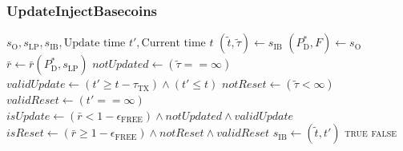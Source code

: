 \documentclass{ifcolog}
\newcommand{\Pdt}{P_{\mathrm{D}}^{*}}
\newcommand{\rr}{\bar{r}}
\newcommand{\slp}{s_{\mathrm{LP}}}
\newcommand{\soracle}{s_{\textrm{O}}}
\newcommand{\sarb}{s_{\textrm{ARB}}}
\newcommand{\sib}{s_{\textrm{IB}}}
\newcommand{\tautx}{\tau_{\textrm{TX}}}
\newcommand{\epsilonfree}{\epsilon_{\textrm{FREE}}}
\begin{document}

\newpage

\subsubsection{UpdateInjectBasecoins}

\begin{algorithm}[H]
\caption{UpdateInjectBasecoins}\label{alg:update-inject-basecoins}
\begin{algorithmic}[1]
\Require $\soracle, \slp, \sib, \textrm{Update time } t', \textrm{Current time } t$
\State $(\tilde{t}, \tilde{\tau}) \gets \sib$
\State $(\Pdt, F) \gets \soracle$
\State $\rr \gets \rr(\Pdt, \slp)$
\State $notUpdated \gets (\tilde{\tau} == \infty)$
\State $validUpdate \gets (t' \ge t - \tautx) \land (t' \le t)$ 
\State $notReset \gets (\tilde{\tau} < \infty)$
\State $validReset \gets (t' == \infty)$
\State $isUpdate \gets (\rr < 1  - \epsilonfree) \land notUpdated \land validUpdate$ 
\State $isReset \gets (\rr \ge 1 - \epsilonfree) \land notReset \land validReset$
  \State $\sib \gets (\tilde{t}, t')$
  \State \Return \textsc{true}
\Else
  \State \Return \textsc{false}
\EndIf
\end{algorithmic}
\end{algorithm}
\end{document}

